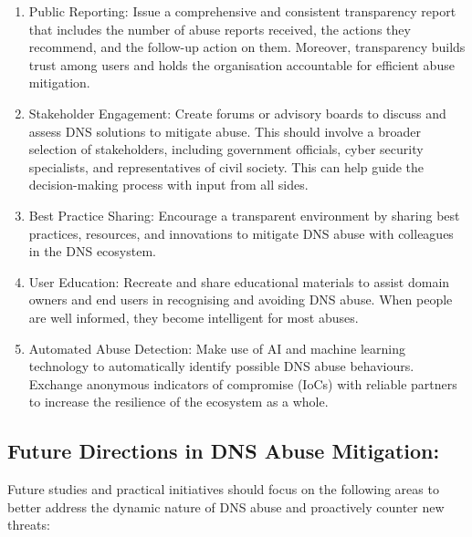\begin{enumerate}
    \item Public Reporting: Issue a comprehensive and consistent transparency report that includes the number of abuse reports received, the actions they recommend, and the follow-up action on them. Moreover, transparency builds trust among users and holds the organisation accountable for efficient abuse mitigation.

    \item Stakeholder Engagement: Create forums or advisory boards to discuss and assess DNS solutions to mitigate abuse. This should involve a broader selection of stakeholders, including government officials, cyber security specialists, and representatives of civil society. This can help guide the decision-making process with input from all sides.

    \item Best Practice Sharing: Encourage a transparent environment by sharing best practices, resources, and innovations to mitigate DNS abuse with colleagues in the DNS ecosystem. 

    \item User Education: Recreate and share educational materials to assist domain owners and end users in recognising and avoiding DNS abuse. When people are well informed, they become intelligent for most abuses.

    \item Automated Abuse Detection: Make use of AI and machine learning technology to automatically identify possible DNS abuse behaviours. Exchange anonymous indicators of compromise (IoCs) with reliable partners to increase the resilience of the ecosystem as a whole.

\end{enumerate}


\subsection{Future Directions in DNS Abuse Mitigation: }

Future studies and practical initiatives should focus on the following areas to better address the dynamic nature of DNS abuse and proactively counter new threats:

